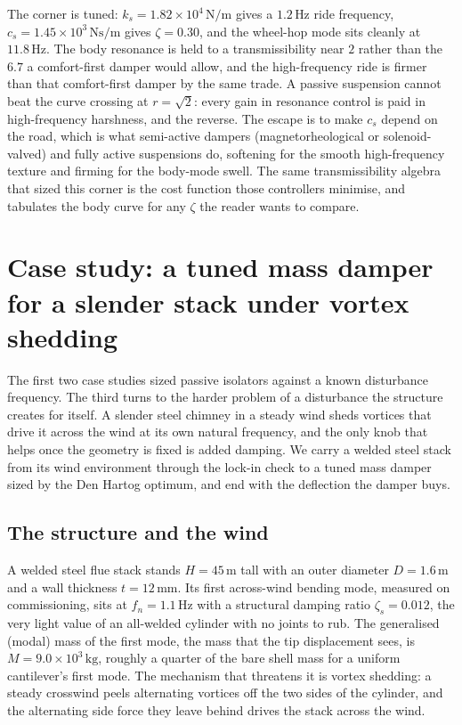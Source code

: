 The corner is tuned: $k_s = 1.82\times 10^4\,\si{\newton\per\meter}$
gives a $1.2\,\si{\hertz}$ ride frequency, $c_s = 1.45\times 10^3\,\si{
\newton\second\per\meter}$ gives $\zeta = 0.30$, and the wheel-hop mode
sits cleanly at $11.8\,\si{\hertz}$. The body resonance is held to a
transmissibility near $2$ rather than the $6.7$ a comfort-first damper
would allow, and the high-frequency ride is firmer than that
comfort-first damper by the same trade. A passive suspension cannot beat
the curve crossing at $r = \sqrt2$: every gain in resonance control is
paid in high-frequency harshness, and the reverse. The escape is to make
$c_s$ depend on the road, which is what semi-active dampers
(magnetorheological or solenoid-valved) and fully active suspensions do,
softening for the smooth high-frequency texture and firming for the
body-mode swell. The same transmissibility algebra that sized this
corner is the cost function those controllers minimise, and
 tabulates the body curve for any
$\zeta$ the reader wants to compare.

\section{Case study: a tuned mass damper for a slender stack under
vortex shedding}

The first two case studies sized passive isolators against a known
disturbance frequency. The third turns to the harder problem of a
disturbance the structure creates for itself. A slender steel chimney in
a steady wind sheds vortices that drive it across the wind at its own
natural frequency, and the only knob that helps once the geometry is
fixed is added damping. We carry a welded steel stack from its wind
environment through the lock-in check to a tuned mass damper sized by the
Den Hartog optimum, and end with the deflection the damper buys.

\subsection{The structure and the wind}

A welded steel flue stack stands $H = 45\,\si{\meter}$ tall with an outer
diameter $D = 1.6\,\si{\meter}$ and a wall thickness $t = 12\,\si{\milli
\meter}$. Its first across-wind bending mode, measured on commissioning,
sits at $f_n = 1.1\,\si{\hertz}$ with a structural damping ratio
$\zeta_s = 0.012$, the very light value of an all-welded cylinder with no
joints to rub. The generalised (modal) mass of the first mode, the mass
that the tip displacement sees, is $M = 9.0\times 10^3\,\si{\kilogram}$,
roughly a quarter of the bare shell mass for a uniform cantilever's
first mode. The mechanism that threatens it is vortex shedding: a steady
crosswind peels alternating vortices off the two sides of the cylinder,
and the alternating side force they leave behind drives the stack across
the wind.

